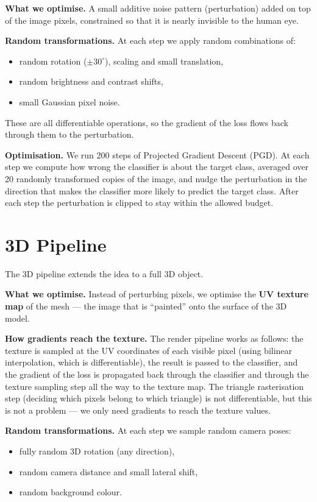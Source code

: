 \documentclass[11pt,a4paper]{article}
\begin{document}
\textbf{What we optimise.} A small additive noise pattern (perturbation)
added on top of the image pixels, constrained so that it is nearly invisible
to the human eye.

\textbf{Random transformations.} At each step we apply random combinations of:
\begin{itemize}[noitemsep,topsep=2pt]
  \item random rotation ($\pm30^\circ$), scaling and small translation,
  \item random brightness and contrast shifts,
  \item small Gaussian pixel noise.
\end{itemize}
These are all differentiable operations, so the gradient of the loss
flows back through them to the perturbation.

\textbf{Optimisation.} We run 200 steps of Projected Gradient Descent (PGD).
At each step we compute how wrong the classifier is about the target class,
averaged over 20 randomly transformed copies of the image,
and nudge the perturbation in the direction that makes the classifier
more likely to predict the target class.
After each step the perturbation is clipped to stay within the allowed budget.

\section{3D Pipeline}

The 3D pipeline extends the idea to a full 3D object.

\textbf{What we optimise.} Instead of perturbing pixels,
we optimise the \textbf{UV texture map} of the mesh ---
the image that is ``painted'' onto the surface of the 3D model.

\textbf{How gradients reach the texture.}
The render pipeline works as follows:
the texture is sampled at the UV coordinates of each visible pixel
(using bilinear interpolation, which is differentiable),
the result is passed to the classifier,
and the gradient of the loss is propagated back through the classifier
and through the texture sampling step all the way to the texture map.
The triangle rasterisation step (deciding which pixels belong to which triangle)
is not differentiable, but this is not a problem --- we only need
gradients to reach the texture values.

\textbf{Random transformations.} At each step we sample random camera poses:
\begin{itemize}[noitemsep,topsep=2pt]
  \item fully random 3D rotation (any direction),
  \item random camera distance and small lateral shift,
  \item random background colour.
\end{itemize}
\end{document}
